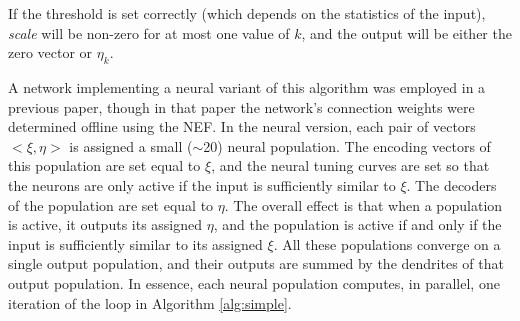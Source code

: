 \documentclass[10pt,letterpaper]{article}
\begin{document}
If the threshold is set correctly (which depends on the statistics of the input), \textit{scale} will be non-zero for at most one value of $k$, and the output will be either the zero vector or $\eta_k$.

A network implementing a neural variant of this algorithm was employed in a previous paper, though in that paper the network's connection weights were determined offline using the NEF. In the neural version, each pair of vectors $<\xi, \eta>$ is assigned a small ($\sim$20) neural population. The encoding vectors of this population are set equal to $\xi$, and the neural tuning curves are set so that the neurons are only active if the input is sufficiently similar to $\xi$. The decoders of the population are set equal to $\eta$. The overall effect is that when a population is active, it outputs its assigned $\eta$, and the population is active if and only if the input is sufficiently similar to its assigned $\xi$. All these populations converge on a single output population, and their outputs are summed by the dendrites of that output population. In essence, each neural population computes, in parallel, one iteration of the loop in Algorithm \ref{alg:simple}.
\end{document}
